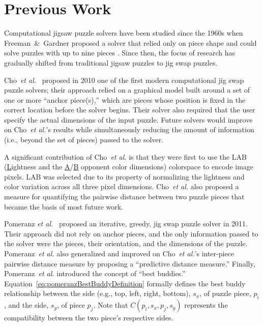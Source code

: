 \chapter{Previous Work}\label{chap:previousWork}

Computational jigsaw puzzle solvers have been studied since the 1960s when Freeman~\&~Gardner proposed a solver that relied only on piece shape and could solve puzzles with up to nine pieces \cite{freeman1964}.  Since then, the focus of research has gradually shifted from traditional jigsaw puzzles to jig swap puzzles.  

Cho~\textit{et al.}~\cite{cho2010} proposed in 2010 one of the first modern computational jig swap puzzle solvers; their approach relied on a graphical model built around a set of one or more ``anchor piece(s),'' which are pieces whose position is fixed in the correct location before the solver begins.  Their solver also required that the user specify the actual dimensions of the input puzzle.  Future solvers would improve on Cho~\textit{et al.}'s results while simultaneously reducing the amount of information (i.e., beyond the set of pieces) passed to the solver.

A significant contribution of Cho~\textit{et al.} is that they were first to use the LAB  (\underline{L}ightness and the \underline{A}/\underline{B} opponent color dimensions) colorspace to encode image pixels.  LAB was selected due to its property of normalizing the lightness and color variation across all three pixel dimensions.  Cho~\textit{et al.} also proposed a measure for quantifying the pairwise distance between two puzzle pieces that became the basis of most future work.  

Pomeranz \textit{et al.}~\cite{pomeranz2011} proposed an iterative, greedy, jig swap puzzle solver in 2011.  Their approach did not rely on anchor pieces, and the only information passed to the solver were the pieces, their orientation, and the dimensions of the puzzle.  Pomeranz~\textit{et al.} also generalized and improved on Cho~\textit{et al.}'s inter-piece pairwise distance measure by proposing a ``predictive distance measure.''  Finally, Pomeranz~\textit{et al.} introduced the concept of ``best buddies.'' Equation~\ref{eq:pomeranzBestBuddyDefinition} formally defines the best buddy relationship between the side (e.g., top, left, right, bottom), $s_x$, of puzzle piece, $p_i$, and the side, $s_y$, of piece $p_j$.  Note that $C(p_i, s_x, p_j, s_y)$ represents the compatibility between the two piece's respective sides.


